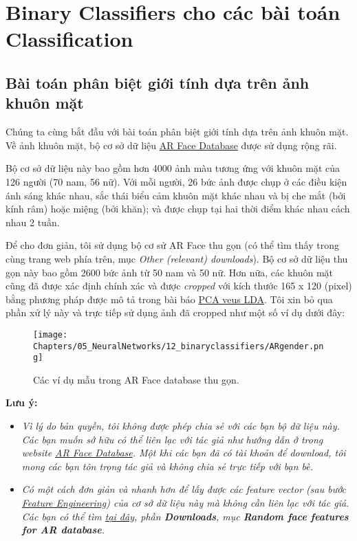 \chapter{Binary Classifiers cho các bài toán Classification}
 
 
\section{Bài toán phân biệt giới tính dựa trên ảnh khuôn mặt }
Chúng ta cùng bắt đầu với bài toán phân biệt giới tính dựa trên ảnh khuôn mặt. Về ảnh khuôn mặt, bộ cơ sở dữ liệu \href{http://www2.ece.ohio-state.edu/~aleix/ARdatabase.html}{AR Face Database} được sử dụng rộng rãi.  
 
Bộ cơ sở dữ liệu này bao gồm hơn 4000 ảnh màu tương ứng với khuôn mặt của 126 người (70 nam, 56 nữ). Với mỗi người, 26 bức ảnh được chụp ở các điều kiện ánh sáng khác nhau, sắc thái biểu cảm khuôn mặt khác nhau và bị che mắt (bởi kính râm) hoặc miệng (bởi khăn); và được chụp tại hai thời điểm khác nhau cách nhau 2 tuần.  
 
Để cho đơn giản, tôi sử dụng bộ cơ sử AR Face thu gọn (có thể tìm thấy trong cùng trang web phía trên, mục \textit{Other (relevant) downloads}). Bộ cơ sở dữ liệu thu gọn này bao gồm 2600 bức ảnh từ 50 nam và 50 nữ. Hơn nữa, các khuôn mặt cũng đã được xác định chính xác và được \textit{cropped} với kích thước 165 x 120 (pixel) bằng phương pháp được mô tả trong bài báo \href{http://lectures.molgen.mpg.de/networkanalysis13/PCAversusLDA_eigenfaces.pdf}{PCA veus LDA}. Tôi xin bỏ qua phần xử lý này và trực tiếp sử dụng ảnh đã cropped như một số ví dụ dưới đây: 
 
\begin{figure}[t]
\centering
    \texttt{[image: Chapters/05\_NeuralNetworks/12\_binaryclassifiers/ARgender.png]}
    \caption[]{Các ví dụ mẫu trong AR Face database thu gọn.}
    \label{fig:12_1}
\end{figure}
\textbf{Lưu ý:} 
\begin{itemize}
\item \textit{Vì lý do bản quyền, tôi không được phép chia sẻ với các bạn bộ dữ liệu này. Các bạn muốn sở hữu có thể liên lạc với tác giả như hướng dẫn ở trong website \href{http://www2.ece.ohio-state.edu/~aleix/ARdatabase.html}{AR Face Database}. Một khi các bạn đã có tài khoản để download, tôi mong các bạn tôn trọng tác giả và không chia sẻ trực tiếp với bạn bè.} 
 
\item \textit{Có một cách đơn giản và nhanh hơn để lấy được các feature vector (sau bước \href{http://machinelearningcoban.com/general/2017/02/06/featureengineering/}{Feature Engineering})  của cơ sở dữ liệu này mà không cần liên lạc với tác giả. Các bạn có thể tìm  \href{https://www.umiacs.umd.edu/~zhuolin/projectlcksvd.html}{tại đây}, phần \textbf{Downloads}, mục \textbf{Random face features for AR database}.} 
\end{itemize}
 
